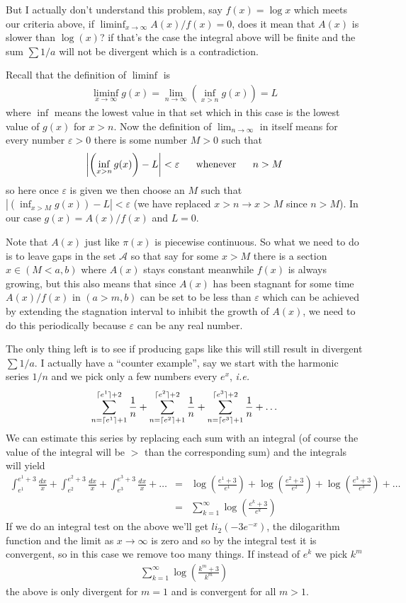 \documentclass[aps,preprint,preprintnumbers,nofootinbib,showpacs,prd]{revtex4-1}
\newcommand{\ie}{{\it i.e.} }
\newcommand{\nbea}{\begin{eqnarray*}}
\newcommand{\neea}{\end{eqnarray*}}
\DeclarePairedDelimiter{\ceil}{\lceil}{\rceil}
\begin{document}
But I actually don't understand this problem, say $f(x) = \log x$ which meets our criteria above, if $\liminf_{x\to\infty} A(x)/f(x) = 0$, does it mean that $A(x)$ is slower than $\log(x)$? if that's the case the integral above will be finite and the sum $\sum 1/a$ will not be divergent which is a contradiction.

Recall that the definition of $\liminf$ is
%
\nbea
\liminf_{x\to\infty} g(x) = \lim_{n\to\infty}\left(\inf_{x>n} g(x)\right) = L
\neea
%
where $\inf$ means the lowest value in that set which in this case is the lowest value of $g(x)$ for $x > n$. Now the definition of $\lim_{n\to\infty}$ in itself means for every number $\varepsilon > 0$ there is some number $M > 0$ such that
%
\nbea
\left|\left(\inf_{x>n} g(x)\right) - L\right| < \varepsilon ~~~~~ {\rm whenever} ~~~~~ n > M
\neea
%
so here once $\varepsilon$ is given we then choose an $M$ such that $\left|\left(\inf_{x>M} g(x)\right) - L\right| < \varepsilon$ (we have replaced $x>n \to x>M$ since $n > M$). In our case $g(x) = A(x)/f(x)$ and $L = 0$.

Note that $A(x)$ just like $\pi(x)$ is piecewise continuous. So what we need to do is to leave gaps in the set $\mathcal{A}$ so that say for some $x > M$ there is a section $x\in(M<a,b)$ where $A(x)$ stays constant meanwhile $f(x)$ is always growing, but this also means that since $A(x)$ has been stagnant for some time $A(x)/f(x)$ in $(a>m,b)$ can be set to be less than $\varepsilon$ which can be achieved by extending the stagnation interval to inhibit the growth of $A(x)$, we need to do this periodically because $\varepsilon$ can be any real number.

The only thing left is to see if producing gaps like this will still result in divergent $\sum 1/a$. I actually have a ``counter example'', say we start with the harmonic series $1/n$ and we pick only a few numbers every $e^x$, \ie 
%
\nbea
\sum_{n=\ceil{e^1}+1}^{\ceil{e^1}+2} \frac{1}{n} + \sum_{n=\ceil{e^2}+1}^{\ceil{e^2}+2} \frac{1}{n} + \sum_{n=\ceil{e^3}+1}^{\ceil{e^3}+2}\frac{1}{n} + \dots
\neea
%
We can estimate this series by replacing each sum with an integral (of course the value of the integral will be $>$ than the corresponding sum) and the integrals will yield
%
\nbea
\int_{e^1}^{e^1+3} \frac{dx}{x} + \int_{e^2}^{e^2+3} \frac{dx}{x} + \int_{e^3}^{e^3+3} \frac{dx}{x} + \dots & = & \log\left(\frac{e^1 + 3}{e^1}\right) + \log\left(\frac{e^2 + 3}{e^2}\right) + \log\left(\frac{e^3 + 3}{e^3}\right) + \dots \\
& = & \sum_{k = 1}^{\infty} \log \left(\frac{e^k+3}{e^k}\right)
\neea
%
If we do an integral test on the above we'll get ${{\mathit{li}}_{2}}\left(-3{{e}^{-x}}\right)$, the dilogarithm function and the limit as $x\to\infty$ is zero and so by the integral test it is convergent, so in this case we remove too many things. If instead of $e^k$ we pick $k^m$
%
\nbea
\sum_{k = 1}^{\infty} \log \left(\frac{k^{m}+3}{k^{m}}\right)
\neea
%
the above is only divergent for $m=1$ and is convergent for all $m > 1$.
\end{document}
